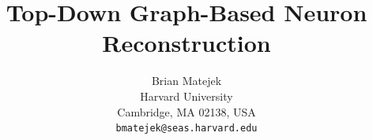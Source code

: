 \documentclass[10pt,twocolumn,letterpaper]{article}
\begin{document}
\title{Top-Down Graph-Based Neuron Reconstruction}


\author{Brian Matejek\\
Harvard University\\
Cambridge, MA 02138, USA\\
{\tt\small bmatejek@seas.harvard.edu}
}

\maketitle
\end{document}

